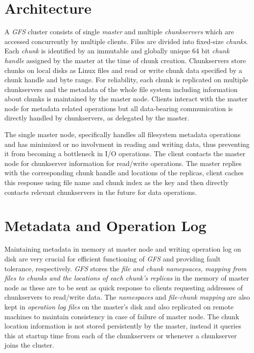 \documentclass[12pt, a4paper]{article}
\begin{document}
\section*{Architecture}
A \textit{GFS}\cite{Ghemawat:2003:GFS:945445.945450} cluster consists of single \textit{master} and multiple \textit{chunkservers} which are accessed concurrently by multiple clients. Files are divided into fixed-size \textit{chunks}. Each \textit{chunk} is identified by an immutable and globally unique 64 bit \textit{chunk handle} assigned by the master at the time of chunk creation. Chunkservers store chunks on local disks as Linux files and read or write chunk data specified by a chunk handle and byte range. For reliability, each chunk is replicated on multiple chunkservers and the metadata of the whole file system including information about chunks is maintained by the master node. Clients interact with the master node for metadata related operations but all data-bearing communication is directly handled by chunkservers, as delegated by the master.\par

The single master node, specifically handles all filesystem metadata operations and has minimized or no involvment in reading and writing data, thus preventing it from becoming a bottleneck in I/O operations. The client contacts the master node for chunkserver information for read/write operations. The master replies with the corresponding chunk handle and locations of the replicas, client caches this response using file name and chunk index as the key and then directly contacts relevant chunkservers in the future for data operations.\par

\section*{Metadata and Operation Log}
Maintaining metadata in memory at master node and writing operation log on disk are very crucial for efficient functioning of \textit{GFS}\cite{Ghemawat:2003:GFS:945445.945450} and providing fault tolerance, respectively. \textit{GFS}\cite{Ghemawat:2003:GFS:945445.945450} stores the \textit{file and chunk namepsaces, mapping from files to chunks and the locations of each chunk's replicas} in the memory of master node as these are to be sent as quick response to clients requesting addresses of chunkservers to read/write data. The \textit{namespaces} and \textit{file-chunk mapping} are also kept in \textit{operation log files} on the master's disk and also replicated on remote machines to maintain consistency in case of failure of master node. The chunk location information is not stored persistently by the master, instead it queries this at startup time from each of the chunkservers or whenever a chunkserver joins the cluster.\par
\end{document}

